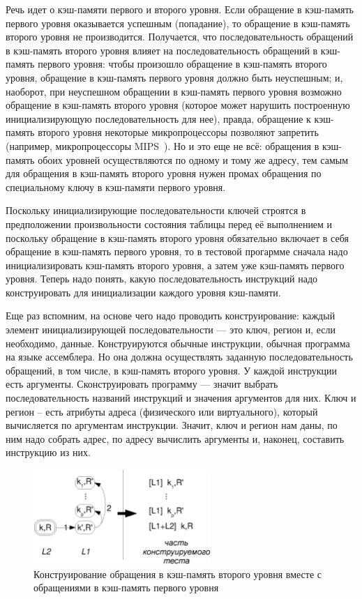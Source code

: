 Речь идет о кэш-памяти первого и второго уровня. Если обращение в кэш-память
первого уровня оказывается успешным (попадание), то обращение в кэш-память
второго уровня не производится. Получается, что последовательность обращений в
кэш-память второго уровня влияет на последовательность обращений в кэш-память
первого уровня: чтобы произошло обращение в кэш-память второго уровня, обращение
в кэш-память первого уровня должно быть неуспешным; и, наоборот, при неуспешном
обращении в кэш-память первого уровня возможно обращение в кэш-память второго
уровня (которое может нарушить построенную инициализирующую последовательность
для нее), правда, обращение к кэш-память второго уровня некоторые
микропроцессоры позволяют запретить (например, микропроцессоры
MIPS~\cite{mips64III}). Но и это еще не всё: обращения в кэш-память обоих
уровней осуществляются по одному и тому же адресу, тем самым для обращения в
кэш-память второго уровня нужен промах обращения по специальному ключу в
кэш-памяти первого уровня.

Поскольку инициализирующие последовательности ключей строятся в предположении
произвольности состояния таблицы перед её выполнением и поскольку обращение в
кэш-память второго уровня обязательно включает в себя обращение в кэш-память
первого уровня, то в тестовой прогармме сначала надо инициализировать кэш-память
второго уровня, а затем уже кэш-память первого уровня. Теперь надо понять, какую
последовательность инструкций надо конструировать для инициализации каждого
уровня кэш-памяти.

Еще раз вспомним, на основе чего надо проводить конструирование: каждый элемент
инициализирующей последовательности --- это ключ, регион и, если необходимо, данные.
Конструируются обычные инструкции, обычная программа на языке ассемблера. Но она
должна осуществлять заданную последовательность обращений, в том числе, в
кэш-память второго уровня. У каждой инструкции есть аргументы. Сконструировать
программу --- значит выбрать последовательность названий инструкций и значения
аргументов для них. Ключ и регион -- есть атрибуты адреса (физического или
виртуального), который вычисляется по аргументам инструкции. Значит, ключ и
регион нам даны, по ним надо собрать адрес, по адресу вычислить аргументы и,
наконец, составить инструкцию из них.

\begin{figure}[h] \centering
\includegraphics[width=0.6\textwidth]{2.theor/L1L2}
\caption{Конструирование обращения в кэш-память второго уровня вместе с
обращениями в кэш-память первого уровня}\label{fig:L1L2}
\end{figure}

